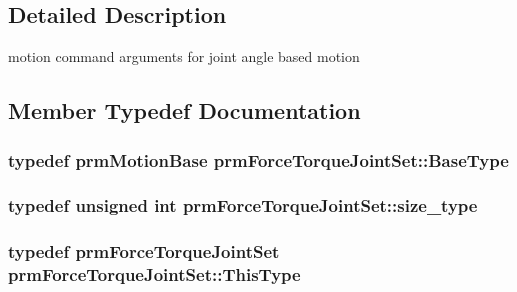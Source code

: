 \subsection{Detailed Description}
motion command arguments for joint angle based motion 

\subsection{Member Typedef Documentation}
\hypertarget{classprm_force_torque_joint_set_a5381a0507902adc394509c016450ad79}{
\subsubsection[{Base\-Type}]{\setlength{\rightskip}{0pt plus 5cm}typedef {\bf prm\-Motion\-Base} {\bf prm\-Force\-Torque\-Joint\-Set\-::\-Base\-Type}}}\label{classprm_force_torque_joint_set_a5381a0507902adc394509c016450ad79}
\hypertarget{classprm_force_torque_joint_set_a2fa9d363f410074de832a3f627f3b43b}{
\subsubsection[{size\-\_\-type}]{\setlength{\rightskip}{0pt plus 5cm}typedef unsigned int {\bf prm\-Force\-Torque\-Joint\-Set\-::size\-\_\-type}}}\label{classprm_force_torque_joint_set_a2fa9d363f410074de832a3f627f3b43b}
\hypertarget{classprm_force_torque_joint_set_a18867cb10dfae15004f3c72b30481f20}{
\subsubsection[{This\-Type}]{\setlength{\rightskip}{0pt plus 5cm}typedef {\bf prm\-Force\-Torque\-Joint\-Set} {\bf prm\-Force\-Torque\-Joint\-Set\-::\-This\-Type}}}\label{classprm_force_torque_joint_set_a18867cb10dfae15004f3c72b30481f20}



